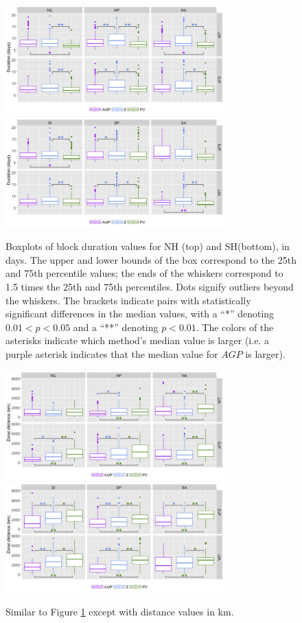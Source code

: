 \documentclass[smallextended]{svjour3}       %
\numberwithin{equation}{section}
\begin{document}
\begin{figure}
    \centering
    \includegraphics[width=0.75\textwidth]{fig7a.png}
    \includegraphics[width=0.75\textwidth]{fig7b.png}
    \caption{Boxplots of block duration values for NH (top) and SH(bottom), in days. The upper and lower bounds of the box correspond to the 25th and 75th percentile values; the ends of the whiskers correspond to 1.5 times the 25th and 75th percentiles. Dots signify outliers beyond the whiskers. The brackets indicate pairs with statistically significant differences in the median values, with a ``*'' denoting $0.01<p<0.05$ and a ``**'' denoting $p<0.01$. The colors of the asterisks indicate which method's median value is larger (i.e. a purple asterisk indicates that the median value for $AGP$ is larger).}
    \label{duration}
\end{figure}

\begin{figure}
    \centering
    \includegraphics[width=0.75\textwidth]{fig8a.png}
    \includegraphics[width=0.75\textwidth]{fig8b.png}
    \caption{Similar to Figure \ref{duration} except with distance values in km.}
    \label{dist}
\end{figure}
\end{document}
